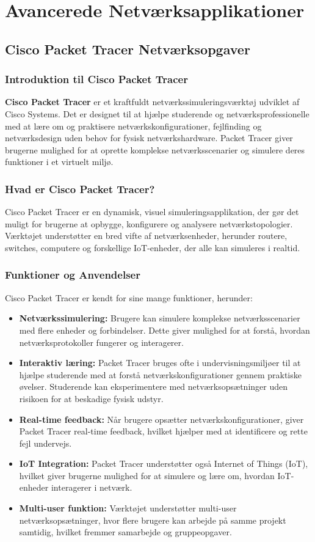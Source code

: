 \part{Avancerede Netværksapplikationer}
\chapter{Cisco Packet Tracer Netværksopgaver}
\section*{Introduktion til Cisco Packet Tracer}
\textbf{Cisco Packet Tracer} er et kraftfuldt netværkssimuleringsværktøj udviklet af Cisco Systems. Det er designet til at hjælpe studerende og netværksprofessionelle med at lære om og praktisere netværkskonfigurationer, fejlfinding og netværksdesign uden behov for fysisk netværkshardware. Packet Tracer giver brugerne mulighed for at oprette komplekse netværksscenarier og simulere deres funktioner i et virtuelt miljø.

\section*{Hvad er Cisco Packet Tracer?}
Cisco Packet Tracer er en dynamisk, visuel simuleringsapplikation, der gør det muligt for brugerne at opbygge, konfigurere og analysere netværkstopologier. Værktøjet understøtter en bred vifte af netværksenheder, herunder routere, switches, computere og forskellige IoT-enheder, der alle kan simuleres i realtid.

\section*{Funktioner og Anvendelser}
Cisco Packet Tracer er kendt for sine mange funktioner, herunder:
\begin{itemize}
	\item \textbf{Netværkssimulering:} Brugere kan simulere komplekse netværksscenarier med flere enheder og forbindelser. Dette giver mulighed for at forstå, hvordan netværksprotokoller fungerer og interagerer.
	\item \textbf{Interaktiv læring:} Packet Tracer bruges ofte i undervisningsmiljøer til at hjælpe studerende med at forstå netværkskonfigurationer gennem praktiske øvelser. Studerende kan eksperimentere med netværksopsætninger uden risikoen for at beskadige fysisk udstyr.
	\item \textbf{Real-time feedback:} Når brugere opsætter netværkskonfigurationer, giver Packet Tracer real-time feedback, hvilket hjælper med at identificere og rette fejl undervejs.
	\item \textbf{IoT Integration:} Packet Tracer understøtter også Internet of Things (IoT), hvilket giver brugerne mulighed for at simulere og lære om, hvordan IoT-enheder interagerer i netværk.
	\item \textbf{Multi-user funktion:} Værktøjet understøtter multi-user netværksopsætninger, hvor flere brugere kan arbejde på samme projekt samtidig, hvilket fremmer samarbejde og gruppeopgaver.
\end{itemize}

